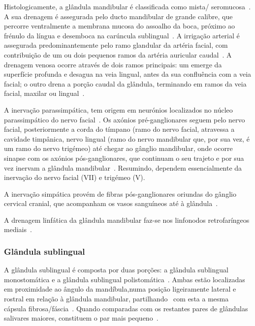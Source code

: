 Histologicamente, a glândula mandibular é classificada como mista/ seromucosa~\cite{evans_millers_2012,Singh2017}. 
A sua drenagem é assegurada pelo ducto mandibular de grande calibre, que percorre ventralmente a membrana mucosa do assoalho  da boca, próximo ao frénulo da língua e desemboca na carúncula sublingual~\cite{Singh2017}.
A irrigação arterial é assegurada predominantemente pelo ramo glandular da artéria facial, com contribuição de um ou dois pequenos ramos da artéria auricular caudal~\cite{Singh2017}. A drenagem venosa ocorre através de dois ramos principais: um emerge da superfície profunda e desagua na veia lingual, antes da sua confluência com a veia facial; o outro drena a porção caudal da glândula, terminando em ramos da veia facial, maxilar ou lingual~\cite{Singh2017}.


A inervação parassimpática, tem origem em neurónios localizados no núcleo parassimpático do nervo facial~\cite{Singh2017}. Os axónios pré-ganglionares seguem pelo nervo facial, posteriormente a corda do tímpano (ramo do nervo facial, atravessa a cavidade timpânica, nervo lingual (ramo do nervo mandibular que, por sua vez, é um ramo do nervo trigémeo) até chegar ao gânglio mandibular, onde ocorre sinapse com os axónios pós-ganglionares, que continuam o seu trajeto e por sua vez inervam a glândula mandibular~\cite{Singh2017}. Resumindo, dependem essencialmente da inervação do nervo facial (VII) e trigémeo (V).


A inervação simpática provém de fibras pós-ganglionares  oriundas do gânglio cervical cranial, que acompanham os vasos sanguíneos até à glândula~\cite{Singh2017}.


A drenagem linfática da glândula mandibular faz-se nos linfonodos retrofaríngeos mediais~\cite{Singh2017}.



\subsubsection{Glândula sublingual}

A glândula sublingual é composta por duas porções: a glândula sublingual monostomática e a glândula sublingual polistomática~\cite{Singh2017}. Ambas estão localizadas em proximidade ao ângulo da mandíbula,numa posição ligeiramente lateral e rostral em relação à glândula mandibular, partilhando~\cite{Han2016} com esta a mesma cápsula fibrosa/fáscia~\cite{evans_millers_2012,Brown2016}. Quando comparadas com os restantes pares de glândulas salivares maiores, constituem o par mais pequeno~\cite{evans_millers_2012}.


